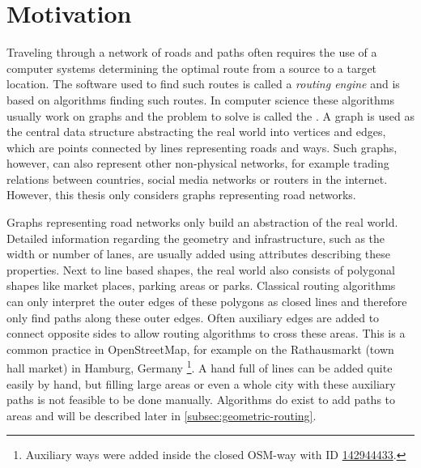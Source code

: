 
\section{Motivation}
	
	Traveling through a network of roads and paths often requires the use of a computer systems determining the optimal route from a source to a target location.
	The software used to find such routes is called a \emph{routing engine} and is based on algorithms finding such routes.
	In computer science these algorithms usually work on graphs and the problem to solve is called the .
	A graph is used as the central data structure abstracting the real world into vertices and edges, which are points connected by lines representing roads and ways.
	Such graphs, however, can also represent other non-physical networks, for example trading relations between countries, social media networks or routers in the internet.
	However, this thesis only considers graphs representing road networks.
	
	Graphs representing road networks only build an abstraction of the real world.
	Detailed information regarding the geometry and infrastructure, such as the width or number of lanes, are usually added using attributes describing these properties.
	Next to line based shapes, the real world also consists of polygonal shapes like market places, parking areas or parks.
	Classical routing algorithms can only interpret the outer edges of these polygons as closed lines and therefore only find paths along these outer edges.
	Often auxiliary edges are added to connect opposite sides to allow routing algorithms to cross these areas.
	This is a common practice in OpenStreetMap, for example on the Rathausmarkt (town hall market) in Hamburg, Germany \footnote{Auxiliary ways were added inside the closed OSM-way with ID  \href{https://www.openstreetmap.org/way/142944433}{142944433}.}.
	A hand full of lines can be added quite easily by hand, but filling large areas or even a whole city with these auxiliary paths is not feasible to be done manually.
	Algorithms do exist to add paths to areas and will be described later in \cref{subsec:geometric-routing}.
	
